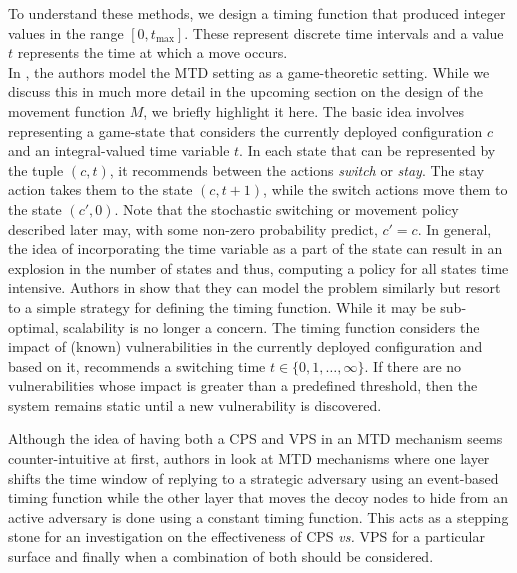 To understand these methods, we design a timing function that produced integer values in the range $[0, t_{\max}]$. These represent discrete time intervals and a value $t$ represents the time at which a move occurs.\\
\indent In , the authors model the MTD setting as a game-theoretic setting. While we discuss this in much more detail in the upcoming section on the design of the movement function $M$, we briefly highlight it here. The basic idea involves representing a game-state that considers the currently deployed configuration $c$ and an integral-valued time variable $t$. In each state that can be represented by the tuple $(c,t)$, it recommends between the actions {\em switch} or {\em stay}.
The stay action takes them to the state $(c, t+1)$, while the switch actions move them to the state $(c',0)$. Note that the stochastic switching or movement policy described later may, with some non-zero probability predict, $c' = c$.
In general, the idea of incorporating the time variable as a part of the state can result in an explosion in the number of states and thus, computing a policy for all states time intensive.
Authors in  show that they can model the problem similarly but resort to a simple strategy for defining the timing function. While it may be sub-optimal, scalability is no longer a concern. The timing function considers the impact of (known) vulnerabilities in the currently deployed configuration and based on it, recommends a switching time $t \in \{0,1,\dots,\infty\}$. If there are no vulnerabilities whose impact is greater than a predefined threshold, then the system remains static until a new vulnerability is discovered.

Although the idea of having both a CPS and VPS in an MTD mechanism seems counter-intuitive at first, authors in  look at MTD mechanisms where one layer shifts the time window of replying to a strategic adversary using an event-based timing function while the other layer that moves the decoy nodes to hide from an active adversary is done using a constant timing function. This acts as a stepping stone for an investigation on the effectiveness of CPS {\em vs.} VPS for a particular surface and finally when a combination of both should be considered.


